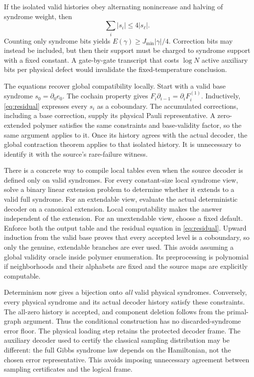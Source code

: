 \documentclass[11pt,a4paper]{article}
\begin{document}
If the isolated valid histories obey alternating nonincrease and halving of syndrome weight, then
\begin{equation}\label{eq:contraction}
 \sum_i |s_i|\leq4|s_\ell|.
\end{equation}
Counting only syndrome bits yields $E(\gamma)\geq J_{\min}|\gamma|/4$. Correction bits may instead be included, but then their support must be charged to syndrome support with a fixed constant. A gate-by-gate transcript that costs $\log N$ active auxiliary bits per physical defect would invalidate the fixed-temperature conclusion.

The equations recover global compatibility locally. Start with a valid base syndrome $s_0=\partial_0 e_0$. The cochain property gives $F_i\partial_{i-1}=\partial_i F_i^{(1)}$. Inductively, \eqref{eq:residual} expresses every $s_i$ as a coboundary. The accumulated corrections, including a base correction, supply its physical Pauli representative. A zero-extended polymer satisfies the same constraints and base-validity factor, so the same argument applies to it. Once its history agrees with the actual decoder, the global contraction theorem applies to that isolated history. It is unnecessary to identify it with the source's rare-failure witness.

There is a concrete way to compile local tables even when the source decoder is defined only on valid syndromes. For every constant-size local syndrome view, solve a binary linear extension problem to determine whether it extends to a valid full syndrome. For an extendable view, evaluate the actual deterministic decoder on a canonical extension. Local computability makes the answer independent of the extension. For an unextendable view, choose a fixed default. Enforce both the output table and the residual equation in \eqref{eq:residual}. Upward induction from the valid base proves that every accepted level is a coboundary, so only the genuine, extendable branches are ever used. This avoids assuming a global validity oracle inside polymer enumeration. Its preprocessing is polynomial if neighborhoods and their alphabets are fixed and the source maps are explicitly computable.

Determinism now gives a bijection onto \emph{all} valid physical syndromes. Conversely, every physical syndrome and its actual decoder history satisfy these constraints. The all-zero history is accepted, and component deletion follows from the primal-graph argument. Thus the conditional construction has no discarded-syndrome error floor. The physical loading step retains the protected decoder frame. The auxiliary decoder used to certify the classical sampling distribution may be different: the full Gibbs syndrome law depends on the Hamiltonian, not the chosen error representative. This avoids imposing unnecessary agreement between sampling certificates and the logical frame.
\end{document}
